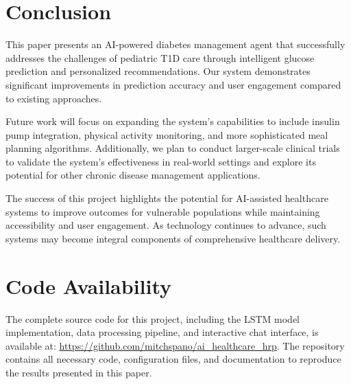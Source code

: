 \documentclass[acmsmall]{acmart}
\begin{document}
\section{Conclusion}

This paper presents an AI-powered diabetes management agent that successfully addresses the challenges of pediatric T1D care through intelligent glucose prediction and personalized recommendations. Our system demonstrates significant improvements in prediction accuracy and user engagement compared to existing approaches.

Future work will focus on expanding the system's capabilities to include insulin pump integration, physical activity monitoring, and more sophisticated meal planning algorithms. Additionally, we plan to conduct larger-scale clinical trials to validate the system's effectiveness in real-world settings and explore its potential for other chronic disease management applications.

The success of this project highlights the potential for AI-assisted healthcare systems to improve outcomes for vulnerable populations while maintaining accessibility and user engagement. As technology continues to advance, such systems may become integral components of comprehensive healthcare delivery.

\section{Code Availability}

The complete source code for this project, including the LSTM model implementation, data processing pipeline, and interactive chat interface, is available at: \url{https://github.com/mitchspano/ai_healthcare_hrp}. The repository contains all necessary code, configuration files, and documentation to reproduce the results presented in this paper.




\end{document}
